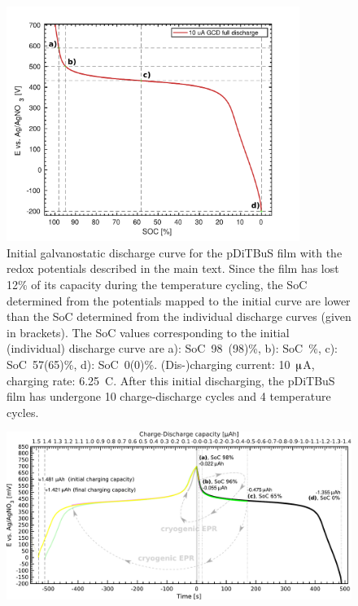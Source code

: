 \begin{figure}[!ht]
\center
	\includegraphics[width=0.85\textwidth]{./pulse/figures/Figure_S3}
	\caption{Initial galvanostatic discharge curve for the pDiTBuS film with the redox potentials described in the main text. Since the film has lost 12\% of its capacity during the temperature cycling, the SoC determined from the potentials mapped to the initial curve are lower than the SoC determined from the individual discharge curves (given in brackets). The SoC values corresponding to the initial (individual) discharge curve are a): SoC~98~(98)\%, b): SoC~\%, c): SoC~57(65)\%, d): SoC~0(0)\%. (Dis-)charging current: 10~$\muup$A, charging rate: 6.25~C. After this initial discharging, the pDiTBuS film has undergone 10 charge-discharge cycles and 4 temperature cycles.}
	\label{fig:Figure_S3}
\end{figure}

\begin{figure}[!ht]
\center
	\includegraphics[width=1\textwidth]{./pulse/figures/Figure_S27}
	\caption{}
	\label{fig:Figure_S27}
\end{figure}

